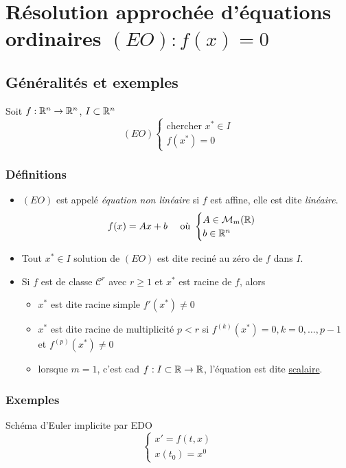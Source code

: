 \chapter{Résolution approchée d'équations ordinaires $(EO): f(x) = 0$}
\section{Généralités et exemples}
Soit $f: \mathbb{R}^n \to \mathbb{R}^n$, $I \subset \mathbb{R}^n$
\[
    (EO) \begin{cases}
        \text{chercher } x^* \in I\\
        f(x^*) = 0
    \end{cases}
\] 

\subsection{Définitions}
\begin{itemize}
    \item $(EO)$ est appelé \textit{équation non linéaire} si  $f$ est affine, elle est dite \textit{linéaire}. 
        \[
        f(x) = Ax + b \quad \text{ où } \begin{cases}
            A \in \mathcal{M}_m(\mathbb{R})\\
            b \in \mathbb{R}^n
        \end{cases}
        \] 
    \item Tout $x^* \in I$ solution de $(EO)$ est dite reciné au zéro de  $f$ dans  $I$.
    \item Si  $f$ est de classe  $\mathcal{C}^r$ avec  $r \ge 1$ et $x^*$ est racine de  $f$, alors
         \begin{itemize}
            \item $x^*$ est dite racine simple  $f'(x^*) \neq 0$
            \item $x^*$ est dite racine de multiplicité $p < r$ si  $f^{(k)}(x^*) = 0, k = 0, \ldots, p-1$ et $f^{(p)}(x^*) \neq 0$
            \item lorsque $m = 1$, c'est cad  $f: I \subset \mathbb{R} \to  \mathbb{R}$, l'équation est dite \underline{scalaire}.
        \end{itemize}
\end{itemize}

\subsection{Exemples}
Schéma d'Euler implicite par EDO
\[
    \begin{cases}
        x' = f(t, x)\\
        x(t_0) = x^0
    \end{cases}
\] 

